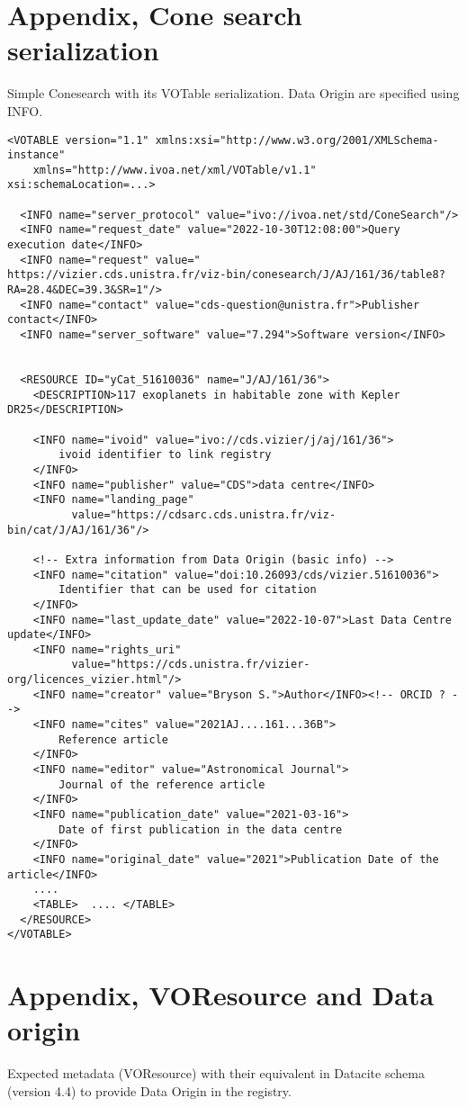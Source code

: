 \documentclass[11pt,a4paper]{ivoa}
\begin{document}
\section{Appendix, Cone search serialization}\label{sec:appendixA}
Simple Conesearch with its VOTable serialization. Data Origin are specified using  INFO.
\begin{verbatim}
<VOTABLE version="1.1" xmlns:xsi="http://www.w3.org/2001/XMLSchema-instance"
    xmlns="http://www.ivoa.net/xml/VOTable/v1.1" xsi:schemaLocation=...>

  <INFO name="server_protocol" value="ivo://ivoa.net/std/ConeSearch"/>
  <INFO name="request_date" value="2022-10-30T12:08:00">Query execution date</INFO>
  <INFO name="request" value="
https://vizier.cds.unistra.fr/viz-bin/conesearch/J/AJ/161/36/table8?
RA=28.4&DEC=39.3&SR=1"/>
  <INFO name="contact" value="cds-question@unistra.fr">Publisher contact</INFO>
  <INFO name="server_software" value="7.294">Software version</INFO>


  <RESOURCE ID="yCat_51610036" name="J/AJ/161/36">
    <DESCRIPTION>117 exoplanets in habitable zone with Kepler DR25</DESCRIPTION>

    <INFO name="ivoid" value="ivo://cds.vizier/j/aj/161/36">
        ivoid identifier to link registry
    </INFO>
    <INFO name="publisher" value="CDS">data centre</INFO>
    <INFO name="landing_page"
          value="https://cdsarc.cds.unistra.fr/viz-bin/cat/J/AJ/161/36"/>

    <!-- Extra information from Data Origin (basic info) -->
    <INFO name="citation" value="doi:10.26093/cds/vizier.51610036">
        Identifier that can be used for citation
    </INFO>
    <INFO name="last_update_date" value="2022-10-07">Last Data Centre update</INFO>
    <INFO name="rights_uri"
          value="https://cds.unistra.fr/vizier-org/licences_vizier.html"/>
    <INFO name="creator" value="Bryson S.">Author</INFO><!-- ORCID ? -->
    <INFO name="cites" value="2021AJ....161...36B">
        Reference article
    </INFO>
    <INFO name="editor" value="Astronomical Journal">
        Journal of the reference article
    </INFO>
    <INFO name="publication_date" value="2021-03-16">
        Date of first publication in the data centre
    </INFO>
    <INFO name="original_date" value="2021">Publication Date of the article</INFO>
    ....
    <TABLE>  .... </TABLE>
  </RESOURCE>
</VOTABLE>
\end{verbatim}

\section{Appendix, VOResource and Data origin}\label{sec:appendixB}
Expected metadata (VOResource) with their equivalent in Datacite schema (version 4.4) to provide Data Origin in the registry.\\
\end{document}
